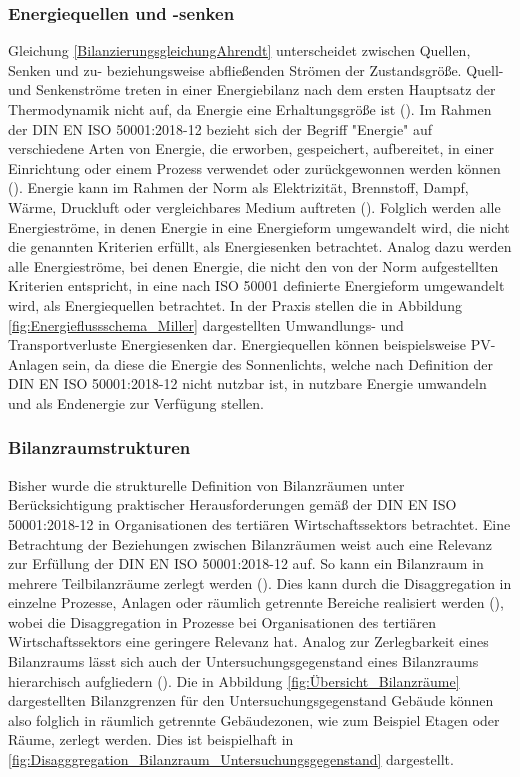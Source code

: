 \subsubsection{Energiequellen und -senken}
Gleichung \eqref{BilanzierungsgleichungAhrendt} unterscheidet zwischen Quellen, Senken und zu- beziehungsweise abfließenden Strömen der Zustandsgröße.
Quell- und Senkenströme treten in einer Energiebilanz nach dem ersten Hauptsatz der Thermodynamik nicht auf, da Energie eine Erhaltungsgröße ist (\cite[S. 14]{Ahrendts.2014}).
Im Rahmen der DIN EN ISO 50001:2018-12 bezieht sich der Begriff "Energie" auf verschiedene Arten von Energie, die erworben, gespeichert, aufbereitet, in einer Einrichtung oder einem Prozess verwendet
oder zurückgewonnen werden können (\cite[Kapitel 3.5.1]{DIN50001.2018}). Energie kann im Rahmen der Norm als Elektrizität, Brennstoff, Dampf, Wärme, Druckluft oder vergleichbares Medium auftreten
(\cite[Kapitel 3.5.1]{DIN50001.2018}).
Folglich werden alle Energieströme, in denen Energie in eine Energieform umgewandelt wird, die nicht die genannten Kriterien erfüllt, als Energiesenken betrachtet.
Analog dazu werden alle Energieströme, bei denen Energie, die nicht den von der Norm aufgestellten Kriterien entspricht, in eine nach ISO 50001 definierte Energieform
umgewandelt wird, als Energiequellen betrachtet.
In der Praxis stellen die in Abbildung \eqref{fig:Energieflussschema_Miller} dargestellten Umwandlungs- und Transportverluste Energiesenken dar. Energiequellen können beispielsweise
PV-Anlagen sein, da diese die Energie des Sonnenlichts, welche nach Definition der DIN EN ISO 50001:2018-12 nicht nutzbar ist, in nutzbare Energie umwandeln und als
Endenergie zur Verfügung stellen.

\subsubsection{Bilanzraumstrukturen}
Bisher wurde die strukturelle Definition von Bilanzräumen unter Berücksichtigung praktischer Herausforderungen gemäß der DIN EN ISO 50001:2018-12 in Organisationen 
des tertiären Wirtschaftssektors betrachtet. Eine Betrachtung der Beziehungen zwischen Bilanzräumen weist auch eine Relevanz zur Erfüllung der DIN EN ISO 50001:2018-12 auf.
So kann ein Bilanzraum in mehrere Teilbilanzräume zerlegt werden (\cite[S. 310]{Engelmann.2015}). Dies kann durch die Disaggregation in einzelne Prozesse, 
Anlagen oder räumlich getrennte Bereiche realisiert werden (\cite[S. 310]{Engelmann.2015}), wobei die Disaggregation in Prozesse bei Organisationen des tertiären 
Wirtschaftssektors eine geringere Relevanz hat.
Analog zur Zerlegbarkeit eines Bilanzraums lässt sich auch der Untersuchungsgegenstand eines Bilanzraums hierarchisch aufgliedern (\cite[S. 109]{Miller.2016}).
Die in Abbildung \eqref{fig:Übersicht_Bilanzräume} dargestellten Bilanzgrenzen für den Untersuchungsgegenstand Gebäude können also folglich in räumlich getrennte 
Gebäudezonen, wie zum Beispiel Etagen oder Räume, zerlegt werden. Dies ist beispielhaft in \eqref{fig:Disagggregation_Bilanzraum_Untersuchungsgegenstand} dargestellt.

